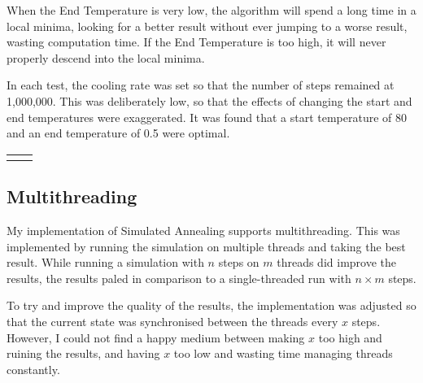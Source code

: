 \documentclass[a4paper, 11pt,table]{article}
\begin{document}
	When the End Temperature is very low, the algorithm will spend a long time in a local minima, looking for a better result without ever jumping to a worse result, wasting computation time. If the End Temperature is too high, it will never properly descend into the local minima.
	
	In each test, the cooling rate was set so that the number of steps remained at 1,000,000. This was deliberately low, so that the effects of changing the start and end temperatures were exaggerated. It was found that a start temperature of 80 and an end temperature of 0.5 were optimal.
	
	
	\begin{tabu}{X[c] X[c]}		
		&
	\end{tabu}
	
	\subsection{Multithreading}	
	My implementation of Simulated Annealing supports multithreading. This was implemented by running the simulation on multiple threads and taking the best result. While running a simulation with $n$ steps on $m$ threads did improve the results, the results paled in comparison to a single-threaded run with $n \times m$ steps.
	
	To try and improve the quality of the results, the implementation was adjusted so that the current state was synchronised between the threads every $x$ steps. However, I could not find a happy medium between making $x$ too high and ruining the results, and having $x$ too low and wasting time managing threads constantly.
	
\end{document}
